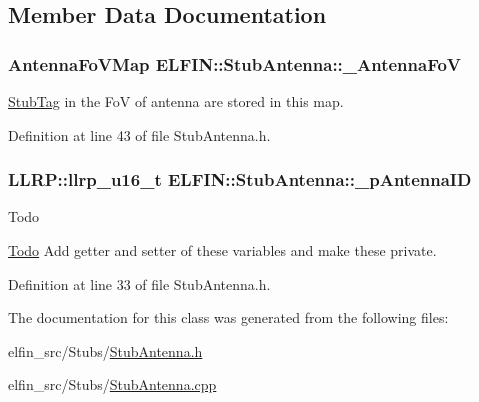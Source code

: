 \subsection{Member Data Documentation}
\hypertarget{class_e_l_f_i_n_1_1_stub_antenna_a6478a8726be1569db9a2345e3a05e780}{
\subsubsection[{\-\_\-\-Antenna\-Fo\-V}]{\setlength{\rightskip}{0pt plus 5cm}Antenna\-Fo\-V\-Map E\-L\-F\-I\-N\-::\-Stub\-Antenna\-::\-\_\-\-Antenna\-Fo\-V\hspace{0.3cm}{\ttfamily [private]}}}\label{class_e_l_f_i_n_1_1_stub_antenna_a6478a8726be1569db9a2345e3a05e780}


\hyperlink{class_e_l_f_i_n_1_1_stub_tag}{Stub\-Tag} in the Fo\-V of antenna are stored in this map. 



Definition at line 43 of file Stub\-Antenna.\-h.

\hypertarget{class_e_l_f_i_n_1_1_stub_antenna_a83bcedc25647781fa894c00c204b821e}{
\subsubsection[{\-\_\-p\-Antenna\-I\-D}]{\setlength{\rightskip}{0pt plus 5cm}L\-L\-R\-P\-::llrp\-\_\-u16\-\_\-t E\-L\-F\-I\-N\-::\-Stub\-Antenna\-::\-\_\-p\-Antenna\-I\-D}}\label{class_e_l_f_i_n_1_1_stub_antenna_a83bcedc25647781fa894c00c204b821e}
\begin{DoxyRefDesc}{Todo}
\item[\hyperlink{todo__todo000021}{Todo}]Add getter and setter of these variables and make these private. \end{DoxyRefDesc}


Definition at line 33 of file Stub\-Antenna.\-h.



The documentation for this class was generated from the following files\-:\begin{DoxyCompactItemize}
\item 
elfin\-\_\-src/\-Stubs/\hyperlink{_stub_antenna_8h}{Stub\-Antenna.\-h}\item 
elfin\-\_\-src/\-Stubs/\hyperlink{_stub_antenna_8cpp}{Stub\-Antenna.\-cpp}\end{DoxyCompactItemize}
